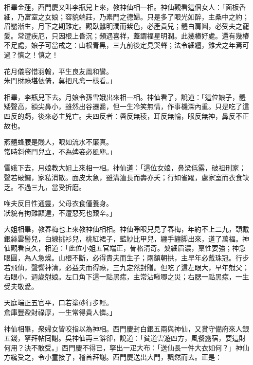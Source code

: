 相畢金蓮，西門慶又叫李瓶兒上來，教神仙相一相。神仙觀看這個女人：「面板香細，{}乃富室之女娘；容貌端莊，乃素門之德婦。只是多了眼光如醉，{}主桑中之約；眉靨漸生，月下之期難定。觀臥蠶明潤而紫色，必產貴兒；體白肩圓，必受夫之寵愛。常遭疾厄，只因根上昏沉；頻遇喜祥，蓋謂福星明潤。此幾樁好處。還有幾樁不足處，娘子可當戒之：山根青黑，三九前後定見哭聲；法令細繵，雞犬之年焉可過？慎之！慎之！

\begin{myquote}
花月儀容惜羽翰，平生良友鳳和鸞。\\朱門財祿堪依倚，莫把凡禽一樣看。」
\end{myquote}

相畢，李瓶兒下去。月娘令孫雪娥出來相一相。神仙看了，說道：「這位娘子，體矮聲高，額尖鼻小，{}雖然出谷遷喬，但一生冷笑無情，作事機深內重。只是吃了這四反的虧，後來必主兇亡。夫四反者：唇反無稜，耳反無輪，眼反無神，鼻反不正故也。

\begin{myquote}
燕體蜂腰是賤人，眼如流水不廉真。\\常時斜倚門兒立，不為婢妾必風塵。」
\end{myquote}

雪娥下去，月娘教大姐上來相一相。神仙道：「這位女娘，鼻梁低露，破祖刑家；聲若破鑼，{}家私消散。面皮太急，雖溝洫長而壽亦夭；行如雀躍，處家室而衣食缺乏。不過三九，當受折磨。

\begin{myquote}
唯夫反目性通靈，父母衣食僅養身。\\狀貌有拘難顯達，不遭惡死也艱辛。」
\end{myquote}

大姐相畢，教春梅也上來教神仙相相。神仙睜眼兒見了春梅，年約不上二九，頭戴銀絲雲髻兒，白線挑衫兒，桃紅裙子，藍紗比甲兒，纏手纏脚出來，道了萬福。神仙觀看良久，相道：「此位小姐五官端正，骨格清奇。髮細眉濃，稟性要強；神急眼圓，為人急燥。{}山根不斷，必得貴夫而生子；兩額朝拱，主早年必戴珠冠。行步若飛仙，聲響神清，必益夫而得祿，三九定然封贈。但吃了這左眼大，早年尅父；右眼小，週歲尅娘。{}左口角下這一點黑痣，主常沾啾唧之災；右腮一點黑痣，一生受夫敬愛。

\begin{myquote}
天庭端正五官平，口若塗砂行步輕。\\倉庫豐盈財祿厚，一生常得貴人憐。」
\end{myquote}

神仙相畢，衆婦女皆咬指以為神相。西門慶封白銀五兩與神仙，又賞守備府來人銀五錢，拏拜帖囘謝。吳神仙再三辭卻，說道：「貧道雲遊四方，風餐露宿，要這財何用？決不敢受。」西門慶不得已，拏出一疋大布：「送仙長一件大衣如何？」神仙方纔受之，令小童接了，稽首拜謝。西門慶送出大門，飄然而去。正是：

